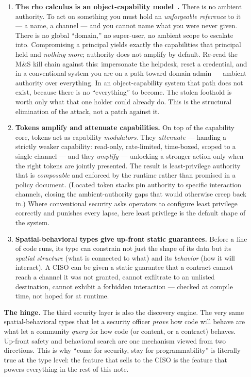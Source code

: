 \documentclass[11pt]{article}
\begin{document}
\begin{enumerate}[leftmargin=1.4em, itemsep=9pt]
  \item \textbf{The rho calculus is an object-capability model~\cite{dennisVanHorn,miller}.} There is no ambient authority. To act on something you must hold an \emph{unforgeable reference} to it --- a name, a channel --- and you cannot name what you were never given. There is no global ``domain,'' no super-user, no ambient scope to escalate into. Compromising a principal yields exactly the capabilities that principal held and \emph{nothing more}; authority does not amplify by default. Re-read the M\&S kill chain against this: impersonate the helpdesk, reset a credential, and in a conventional system you are on a path toward domain admin --- ambient authority over everything. In an object-capability system that path does not exist, because there is no ``everything'' to become. The stolen foothold is worth only what that one holder could already do. This is the structural elimination of the attack, not a patch against it.
  \item \textbf{Tokens amplify and attenuate capabilities.} On top of the capability core, tokens act as capability \emph{modulators}. They \emph{attenuate} --- handing a strictly weaker capability: read-only, rate-limited, time-boxed, scoped to a single channel --- and they \emph{amplify} --- unlocking a stronger action only when the right tokens are jointly presented. The result is least-privilege authority that is \emph{composable} and enforced by the runtime rather than promised in a policy document. (Located token stacks pin authority to specific interaction channels, closing the ambient-authority gaps that would otherwise creep back in.) Where conventional security asks operators to configure least privilege correctly and punishes every lapse, here least privilege is the default shape of the system.
  \item \textbf{Spatial-behavioral types give up-front static guarantees.} Before a line of code runs, its type can constrain not just the shape of its data but its \emph{spatial structure} (what is connected to what) and its \emph{behavior} (how it will interact). A CISO can be given a static guarantee that a contract cannot reach a channel it was not granted, cannot exfiltrate to an unlisted destination, cannot exhibit a forbidden interaction --- checked at compile time, not hoped for at runtime.
\end{enumerate}

\begin{keybox}
\textbf{The hinge.} The third security layer is also the discovery engine. The very same spatial-behavioral types that let a security officer \emph{prove} how code will behave are what let a community \emph{query} for how code (or content, or a contract) behaves. Up-front safety and behavioral search are one mechanism viewed from two directions. This is why ``come for security, stay for programmability'' is literally true at the type level: the feature that sells to the CISO is the feature that powers everything in the rest of this note.
\end{keybox}
\end{document}
